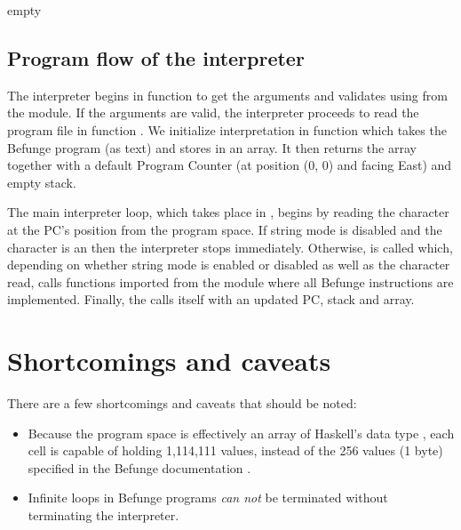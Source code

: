 \documentclass[12pt, a4paper]{article}
\begin{document}
empty

\subsection{Program flow of the interpreter}
\label{sec:interpreterflow}

The interpreter begins in function  to get the arguments and validates using  from the  module. If the arguments are valid, the interpreter proceeds to read the program file in function . We initialize interpretation in function  which takes the Befunge program (as text) and stores in an array. It then returns the array together with a default Program Counter (at position (0, 0) and facing East) and empty stack.

The main interpreter loop, which takes place in , begins by reading the character at the PC's position from the program space. If string mode is disabled and the character is an  then the interpreter stops immediately. Otherwise,  is called which, depending on whether string mode is enabled or disabled as well as the character read, calls functions imported from the module  where all Befunge instructions are implemented. Finally, the  calls itself with an updated PC, stack and array.

\section{Shortcomings and caveats}

There are a few shortcomings and caveats that should be noted:

\begin{itemize}

\item Because the program space is effectively an array of Haskell's data type , each cell is capable of holding 1,114,111 values, instead of the 256 values (1 byte) specified in the Befunge documentation \cite{befunge93}.

\item Infinite loops in Befunge programs \emph{can not} be terminated without terminating the interpreter.

\end{itemize}

\vfill



\end{document}
